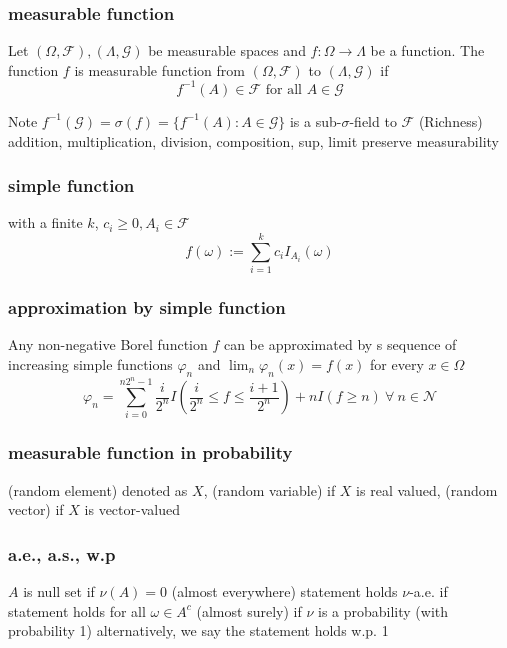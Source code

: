 \subsubsection{measurable function}
Let $(\Omega, \mathcal{F}), (\Lambda, \mathcal{G})$ be measurable spaces and $f: \Omega \rightarrow \Lambda$ be a function. The function $f$ is measurable function from $(\Omega, \mathcal{F})$ to $(\Lambda, \mathcal{G})$ if
$$
f^{-1}(A) \in \mathcal{F} \text{ for all } A \in \mathcal{G}
$$

Note $f^{-1}(\mathcal{G})=\sigma(f)=\{f^{-1}(A):A\in\mathcal{G}\}$ is a sub-$\sigma$-field to $\mathcal{F}$
\newline(Richness) addition, multiplication, division, composition, sup, limit preserve measurability

\subsubsection{simple function}
with a finite $k$, $c_i \geq 0, A_i \in \mathcal{F}$
$$f(\omega):=\sum_{i=1}^k c_iI_{A_i}(\omega)$$ 

\subsubsection{approximation by simple function}
Any non-negative Borel function $f$ can be approximated by s sequence of increasing simple functions $\varphi_n$ and $\lim_n \varphi_n (x) = f(x)$ for every $x\in\Omega$
$$
\varphi_n=\sum_{i=0}^{n2^n-1} \frac{i}{2^n}I\left(\frac{i}{2^n}\leq f \leq \frac{i+1}{2^n}\right) + n I(f \geq n) ~\forall~ n \in \mathcal{N}
$$

\subsubsection{measurable function in probability}

(random element) denoted as $X$, (random variable) if $X$ is real valued, (random vector) if $X$ is vector-valued

\subsubsection{a.e., a.s., w.p}

$A$ is null set if $\nu(A) = 0$
(almost everywhere) statement holds $\nu$-a.e. if statement holds for all $\omega \in A^c$
(almost surely) if $\nu$ is a probability
(with probability 1) alternatively, we say the statement holds w.p. 1

